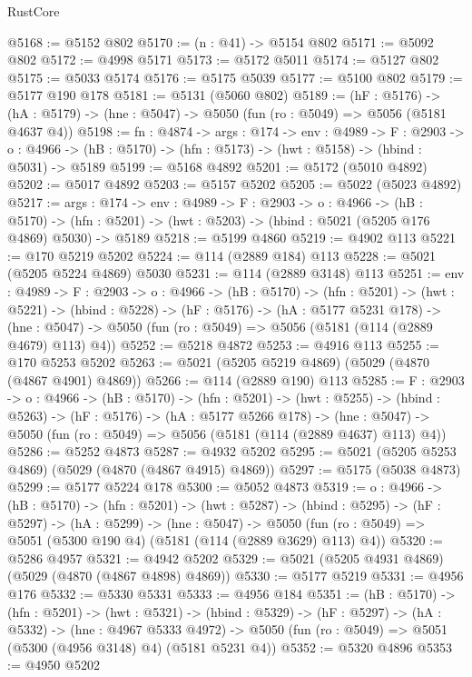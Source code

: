 \begin{lexlean}{RustCore}
\begin{coremodule}
@5168 := @5152 @802
@5170 := (n : @41) -> @5154 @802
@5171 := @5092 @802
@5172 := @4998 @5171
@5173 := @5172 @5011
@5174 := @5127 @802
@5175 := @5033 @5174
@5176 := @5175 @5039
@5177 := @5100 @802
@5179 := @5177 @190 @178
@5181 := @5131 (@5060 @802)
@5189 := (hF : @5176) ->
  (hA : @5179) -> (hne : @5047) -> @5050 (fun (ro : @5049) => @5056 (@5181 @4637 @4))
@5198 := {fn : @4874} ->
  {args : @174} ->
  {env : @4989} ->
  {F : @2903} ->
  {o : @4966} -> (hB : @5170) -> (hfn : @5173) -> (hwt : @5158) -> (hbind : @5031) -> @5189
@5199 := @5168 @4892
@5201 := @5172 (@5010 @4892)
@5202 := @5017 @4892
@5203 := @5157 @5202
@5205 := @5022 (@5023 @4892)
@5217 := {args : @174} ->
  {env : @4989} ->
  {F : @2903} ->
  {o : @4966} ->
  (hB : @5170) ->
  (hfn : @5201) -> (hwt : @5203) -> (hbind : @5021 (@5205 @176 @4869) @5030) -> @5189
@5218 := @5199 @4860
@5219 := @4902 @113
@5221 := @170 @5219 @5202
@5224 := @114 (@2889 @184) @113
@5228 := @5021 (@5205 @5224 @4869) @5030
@5231 := @114 (@2889 @3148) @113
@5251 := {env : @4989} ->
  {F : @2903} ->
  {o : @4966} ->
  (hB : @5170) ->
  (hfn : @5201) ->
  (hwt : @5221) ->
  (hbind : @5228) ->
  (hF : @5176) ->
  (hA : @5177 @5231 @178) ->
  (hne : @5047) -> @5050 (fun (ro : @5049) => @5056 (@5181 (@114 (@2889 @4679) @113) @4))
@5252 := @5218 @4872
@5253 := @4916 @113
@5255 := @170 @5253 @5202
@5263 := @5021 (@5205 @5219 @4869) (@5029 (@4870 (@4867 @4901) @4869))
@5266 := @114 (@2889 @190) @113
@5285 := {F : @2903} ->
  {o : @4966} ->
  (hB : @5170) ->
  (hfn : @5201) ->
  (hwt : @5255) ->
  (hbind : @5263) ->
  (hF : @5176) ->
  (hA : @5177 @5266 @178) ->
  (hne : @5047) -> @5050 (fun (ro : @5049) => @5056 (@5181 (@114 (@2889 @4637) @113) @4))
@5286 := @5252 @4873
@5287 := @4932 @5202
@5295 := @5021 (@5205 @5253 @4869) (@5029 (@4870 (@4867 @4915) @4869))
@5297 := @5175 (@5038 @4873)
@5299 := @5177 @5224 @178
@5300 := @5052 @4873
@5319 := {o : @4966} ->
  (hB : @5170) ->
  (hfn : @5201) ->
  (hwt : @5287) ->
  (hbind : @5295) ->
  (hF : @5297) ->
  (hA : @5299) ->
  (hne : @5047) ->
  @5050 (fun (ro : @5049) => @5051 (@5300 @190 @4) (@5181 (@114 (@2889 @3629) @113) @4))
@5320 := @5286 @4957
@5321 := @4942 @5202
@5329 := @5021 (@5205 @4931 @4869) (@5029 (@4870 (@4867 @4898) @4869))
@5330 := @5177 @5219
@5331 := @4956 @176
@5332 := @5330 @5331
@5333 := @4956 @184
@5351 := (hB : @5170) ->
  (hfn : @5201) ->
  (hwt : @5321) ->
  (hbind : @5329) ->
  (hF : @5297) ->
  (hA : @5332) ->
  (hne : @4967 @5333 @4972) ->
  @5050 (fun (ro : @5049) => @5051 (@5300 (@4956 @3148) @4) (@5181 @5231 @4))
@5352 := @5320 @4896
@5353 := @4950 @5202

\end{coremodule}
\end{lexlean}
